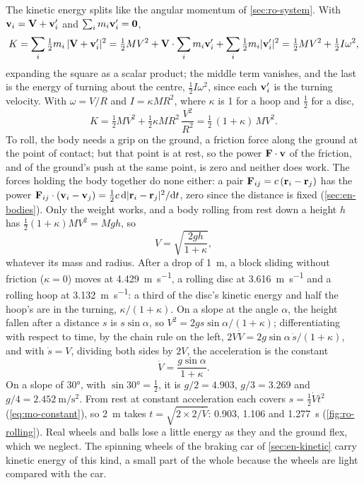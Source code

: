 The kinetic energy splits like the angular momentum of
\cref{sec:ro-system}. With $\bm{\mathrm{v}}_i = \bm{\mathrm{V}} + \bm{\mathrm{v}}_i'$ and $\sum_i
m_i\bm{\mathrm{v}}_i' = \bm{\mathrm{0}}$,
\begin{equation*}
   K = \sum_i\tfrac12 m_i\,\lvert\bm{\mathrm{V}} + \bm{\mathrm{v}}_i'\rvert^2
   = \tfrac12 MV^2 + \bm{\mathrm{V}}\cdot\sum_i m_i\bm{\mathrm{v}}_i'
     + \sum_i\tfrac12 m_i\lvert\bm{\mathrm{v}}_i'\rvert^2
   = \tfrac12 MV^2 + \tfrac12 I\omega^2 ,
\end{equation*}
expanding the square as a scalar product; the middle term vanishes, and
the last is the energy of turning about the centre, $\frac12 I\omega^2$,
since each $\bm{\mathrm{v}}_i'$ is the turning velocity. With $\omega = V/R$ and $I =
\kappa MR^2$, where $\kappa$ is 1 for a hoop and $\frac12$ for a disc,
\begin{equation*}
   K = \tfrac12 MV^2 + \tfrac12\kappa MR^2\,\frac{V^2}{R^2}
   = \tfrac12\,(1 + \kappa)\,MV^2 .
\end{equation*}
To roll, the body needs a grip on the ground, a friction force along the
ground at the point of contact; but that point is at rest, so the power $\bm{\mathrm{F}}\cdot\bm{\mathrm{v}}$ of the friction, and of the ground's push
at the same point, is zero and neither does work. The forces holding the
body together do none either: a pair $\bm{\mathrm{F}}_{ij} = c\,(\bm{\mathrm{r}}_i -
\bm{\mathrm{r}}_j)$ has the power $\bm{\mathrm{F}}_{ij}\cdot(\bm{\mathrm{v}}_i - \bm{\mathrm{v}}_j) = \frac12
c\,\mathrm{d}\lvert\bm{\mathrm{r}}_i - \bm{\mathrm{r}}_j\rvert^2/\mathrm{d} t$, zero since the distance is
fixed (\cref{sec:en-bodies}). Only the weight works, and a body
rolling from rest down a height $h$ has $\frac12(1 + \kappa)MV^2 = Mgh$, so
\begin{equation*}
   V = \sqrt{\frac{2gh}{1 + \kappa}} ,
\end{equation*}
whatever its mass and radius. After a drop of \SI{1}{\metre}, a block
sliding without friction ($\kappa = 0$) moves at \SI{4.429}{\metre\per
\second}, a rolling disc at \SI{3.616}{\metre\per\second} and a rolling
hoop at \SI{3.132}{\metre\per\second}: a third of the disc's kinetic
energy and half the hoop's are in the turning, $\kappa/(1 + \kappa)$. On a
slope at the angle $\alpha$, the height fallen after a distance $s$ is
$s\sin\alpha$, so $V^2 = 2gs\sin\alpha/(1 + \kappa)$; differentiating with
respect to time, by the chain rule on the left, $2V\dot{V} =
2g\sin\alpha\,\dot{s}/(1 + \kappa)$, and with $\dot s = V$, dividing both
sides by $2V$, the acceleration is the constant
\begin{equation*}
   \dot{V} = \frac{g\sin\alpha}{1 + \kappa} .
\end{equation*}
On a slope of \ang{30}, with $\sin\ang{30} = \frac12$, it is $g/2 =
4.903$, $g/3 = 3.269$ and $g/4 = \SI{2.452}{\metre\per\second\squared}$.
From rest at constant acceleration each covers $s = \frac12\dot{V}t^2$
(\cref{eq:mo-constant}), so \SI{2}{\metre} takes $t = \sqrt{2\times2/
\dot{V}}$: 0.903, 1.106 and \SI{1.277}{\second} (\cref{fig:ro-rolling}). Real wheels and balls lose a
little energy as they and the ground flex, which we neglect. The spinning
wheels of the braking car of \cref{sec:en-kinetic} carry kinetic energy of
this kind, a small part of the whole because the wheels are light
compared with the car.

